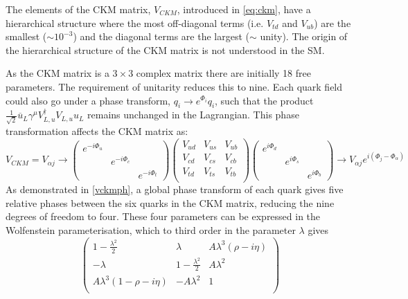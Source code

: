 The elements of the CKM matrix, $V_{CKM}$, introduced in \autoref{eq:ckm}, have a hierarchical structure where the most off-diagonal terms (i.e. $V_{td}$ and $V_{ub}$) are the smallest ($\sim 10^{-3}$) and the diagonal terms are the largest ($\sim$ unity). The origin of the hierarchical structure of the CKM matrix is not understood in the SM.

As the CKM matrix is a $3\times3$ complex matrix there are initially 18 free parameters. The requirement of unitarity reduces this to nine.
Each quark field could also go under a phase transform, $q_{i}\to e^{\Phi_{i}}q_{i}$, such that the product  $\frac{1}{\sqrt{2}}\overline{u}_{L}\gamma^{\mu}V^{\dagger}_{L,u}V_{L,u}u_{L}$ remains unchanged in the Lagrangian. This phase transformation affects the CKM matrix as:
\begin{equation}
  V_{CKM} = V_{\alpha j} \to \begin{pmatrix}e^{-i\Phi_{u}}&&\\&e^{-i\Phi_{c}}&\\&&e^{-i\Phi_{t}}\end{pmatrix}\begin{pmatrix}V_{ud}&V_{us}&V_{ub}\\V_{cd}&V_{cs}&V_{cb}\\V_{td}&V_{ts}&V_{tb}\\\end{pmatrix} \begin{pmatrix}e^{i\Phi_{d}}&&\\&e^{i\Phi_{s}}&\\&&e^{i\Phi_{b}}\end{pmatrix} \to V_{\alpha j}e^{i(\Phi_{j} - \Phi_{\alpha})}
    \label{vckmph}
\end{equation}
As demonstrated in \autoref{vckmph}, a global phase transform of each quark gives five relative phases between the six quarks in the CKM matrix, reducing the nine degrees of freedom to four. These four parameters can be expressed in the Wolfenstein parameterisation, which to third order in the parameter $\lambda$ gives ~\cite{wolf}
\begin{equation}
  \begin{pmatrix}1 - \frac{\lambda^{2}}{2} &\lambda& A\lambda^{3}(\rho - i\eta)\\-\lambda&1-\frac{\lambda^{2}}{2} & A\lambda^{2}\\ A\lambda^{3}(1-\rho - i\eta)&-A\lambda^{2}&1\\\end{pmatrix}
\end{equation}
